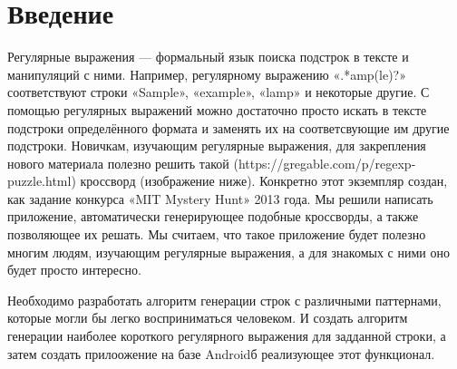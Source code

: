 \documentclass[12pt]{article}
\begin{document}
\section{Введение}
Регулярные выражения — формальный язык поиска подстрок в тексте и манипуляций с ними. Например, регулярному выражению «.*amp(le)?» соответствуют строки «Sample», «example», «lamp» и некоторые другие. С помощью регулярных выражений можно достаточно просто искать в тексте подстроки определённого формата и заменять их на соответсвующие им другие подстроки. Новичкам, изучающим регулярные выражения, для закрепления нового материала полезно решить такой (https://gregable.com/p/regexp-puzzle.html) кроссворд (изображение ниже). Конкретно этот экземпляр создан, как задание конкурса «MIT Mystery Hunt» 2013 года. Мы решили написать приложение, автоматически генерирующее подобные кроссворды, а также позволяющее их решать. Мы считаем, что такое приложение будет полезно многим людям, изучающим регулярные выражения, а для знакомых с ними оно будет просто интересно.

    \newpage %
     Необходимо разработать алгоритм генерации строк с различными паттернами, которые могли бы легко восприниматься человеком.
     И создать алгоритм генерации наиболее короткого регулярного выражения для задданной строки, а затем создать прилоожение на базе Androidб реализующее этот функционал.


    \newpage %
\end{document}
